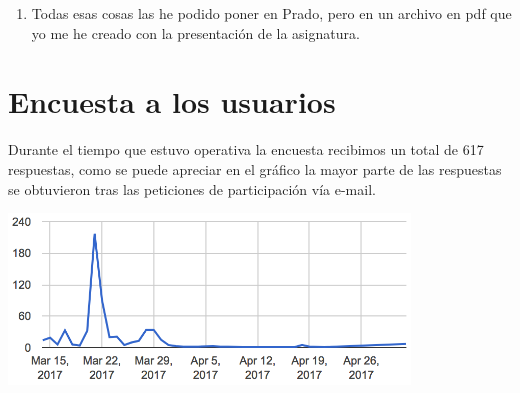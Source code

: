 \begin{enumerate}
\item Todas esas cosas las he podido poner en Prado, pero en un archivo en pdf que yo me he creado con la presentación de la asignatura.
\end{enumerate}

\section{Encuesta a los usuarios}

Durante el tiempo que estuvo operativa la encuesta recibimos un total de 617 respuestas, como se puede apreciar en el gráfico la mayor parte de las respuestas se obtuvieron tras las peticiones de participación vía e-mail.

    \includegraphics[width=0.8\textwidth]{../charts/00_fecha}


